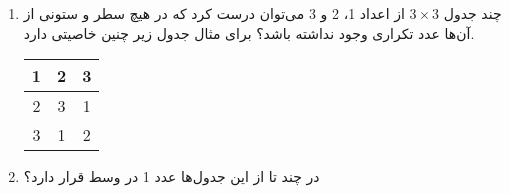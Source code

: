 \begin{enumerate}
    \item
    چند جدول
   $3 \times 3$
    از اعداد 1، 2 و 3 می‌توان درست کرد که در هیچ سطر و ستونی از آن‌ها عدد تکراری وجود نداشته باشد؟ برای مثال جدول زیر چنین خاصیتی دارد.
    \begin{center}
    \begin{tabular}{ |c|c|c| } 
     \hline
     1 & 2 & 3 \\ 
     \hline
     2 & 3 & 1 \\ 
     \hline
     3 & 1 & 2 \\ 
     \hline
    \end{tabular}
    \end{center}
   \item
   در چند تا از این جدول‌ها عدد 1 در وسط قرار دارد؟
\end{enumerate}
